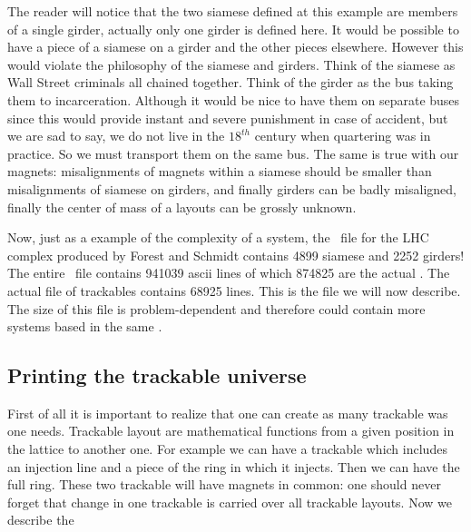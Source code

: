 {{The reader will notice that the two siamese defined at this example are members of a single girder, actually  only one girder is defined here. It would be possible to have a piece of a siamese on a girder and the other pieces elsewhere. However this would violate the philosophy of the siamese and girders. Think of the siamese as Wall Street criminals all chained together. Think of the girder as the bus taking them to incarceration. Although it would be nice to have them on separate buses since this would provide instant and severe punishment in case of accident, but we are sad to say, we do not live in the $18^{th}$ century when quartering was in practice. So we must  transport them on the same bus. The same is true with our magnets: misalignments of magnets within a siamese should be smaller than misalignments of siamese on girders, and finally girders can be badly misaligned, finally the center of mass of a layouts can be grossly unknown. 

Now, just as a example of the complexity of a system, the \DNA\ file for the LHC complex produced by Forest and Schmidt contains 4899 siamese and 2252 girders! The entire \DNA\ file contains 941039 ascii lines of which 874825 are the actual \DNA . The actual file of  trackables contains 68925 lines. This is the file we will now describe.  The size of this file is problem-dependent and therefore could contain more systems based in the same \DNA .

\subsection{Printing the trackable universe}

First of all it is important to realize that one can create as many trackable was one needs. Trackable layout are mathematical  functions from a given position in the lattice to another one. For example we can have a trackable which includes an injection line and a piece of the ring in which it injects. Then we can have the full ring. These   two trackable will have magnets in common: one should never forget that change in one trackable is carried over all trackable layouts. Now we describe the 


}}
